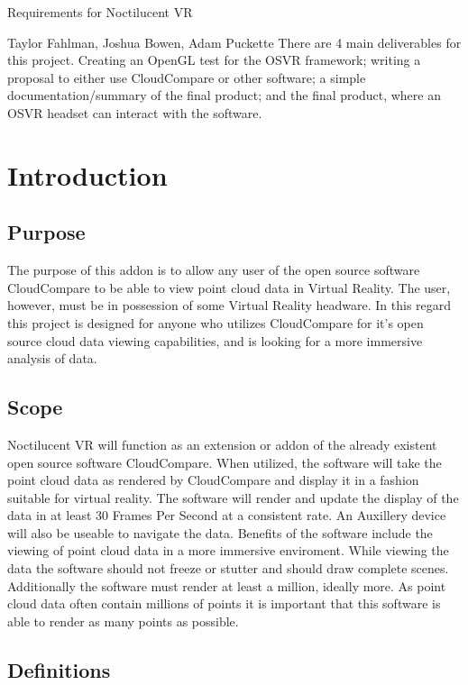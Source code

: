 \documentclass[titlepage]{article}
\begin{document}
\begin{titlepage}
\centering
{\Huge Requirements for Noctilucent VR\par}
{\Large Taylor Fahlman, Joshua Bowen, Adam Puckette}
\abstract
There are 4 main deliverables for this project. Creating an OpenGL test for the OSVR framework;
writing a proposal to either use CloudCompare or other software; a simple documentation/summary of
the final product; and the final product, where an OSVR headset can interact with the software.
\end{titlepage}

\section{Introduction}
\subsection{Purpose}

The purpose of this addon is to allow any user of the open source software CloudCompare to be able to view point cloud data in Virtual Reality.
The user, however, must be in possession of some Virtual Reality headware. 
In this regard this project is designed for anyone who utilizes CloudCompare for it's open source cloud data viewing capabilities,
and is looking for a more immersive analysis of data.

\subsection{Scope}

Noctilucent VR will function as an extension or addon of the already existent open source software CloudCompare.
When utilized, the software will take the point cloud data as rendered by CloudCompare and display it in a fashion suitable for virtual reality.
The software will render and update the display of the data in at least 30 Frames Per Second at a consistent rate.
An Auxillery device will also be useable to navigate the data.
Benefits of the software include the viewing of point cloud data in a more immersive enviroment.
While viewing the data the software should not freeze or stutter and should draw complete scenes. 
Additionally the software must render at least a million, ideally more.
As point cloud data often contain millions of points it is important that this software is able to render as many points as possible.

\subsection{Definitions}
\end{document}
